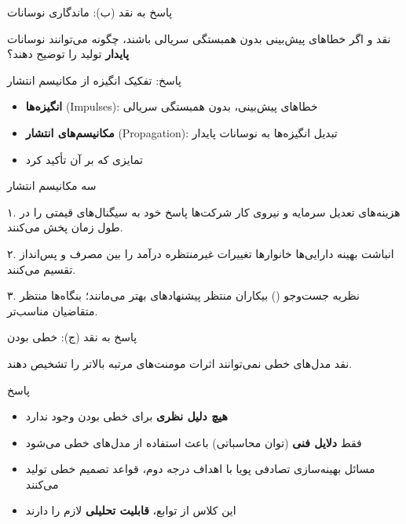 \documentclass[aspectratio=169,11pt]{beamer}
\newcommand{\highlight}[1]{\textcolor{AccentOrange}{\textbf{#1}}}
\newcommand{\important}[1]{\textcolor{AlertRed}{\textbf{#1}}}
\begin{document}
\begin{frame}{پاسخ به نقد (ب): ماندگاری نوسانات}
	\begin{alertblock}{نقد  و }
		\centering
		اگر خطاهای پیش‌بینی بدون همبستگی سریالی باشند، چگونه می‌توانند نوسانات \important{پایدار} تولید را توضیح دهند؟
	\end{alertblock}
	\vspace{0.3cm}
	\begin{exampleblock}{پاسخ: تفکیک انگیزه از مکانیسم انتشار}
		\begin{itemize}
			\item \highlight{انگیزه‌ها} (Impulses): خطاهای پیش‌بینی، بدون همبستگی سریالی
			\item \highlight{مکانیسم‌های انتشار} (Propagation): تبدیل انگیزه‌ها به نوسانات پایدار
			\item تمایزی که  بر آن تأکید کرد
		\end{itemize}
	\end{exampleblock}
\end{frame}

\begin{frame}{سه مکانیسم انتشار}
	\begin{block}{۱. هزینه‌های تعدیل سرمایه و نیروی کار}
		\centering
		شرکت‌ها پاسخ خود به سیگنال‌های قیمتی را در طول زمان پخش می‌کنند.
	\end{block}
	\vspace{0.2cm}
	\begin{block}{۲. انباشت بهینه دارایی‌ها}
		\centering
		خانوارها تغییرات غیرمنتظره درآمد را بین مصرف و پس‌انداز تقسیم می‌کنند.
	\end{block}
	\vspace{0.2cm}
	\begin{block}{۳. نظریه جست‌وجو ()}
		\centering
		بیکاران منتظر پیشنهادهای بهتر می‌مانند؛ بنگاه‌ها منتظر متقاضیان مناسب‌تر.
	\end{block}
\end{frame}

\begin{frame}{پاسخ به نقد (ج): خطی بودن}
	\begin{alertblock}{نقد}
		\centering
		مدل‌های خطی نمی‌توانند اثرات مومنت‌های مرتبه بالاتر را تشخیص دهند.
	\end{alertblock}
	\vspace{0.3cm}
	\begin{exampleblock}{پاسخ}
		\begin{itemize}
			\item \important{هیچ دلیل نظری} برای خطی بودن وجود ندارد
			\item فقط \highlight{دلایل فنی} (توان محاسباتی) باعث استفاده از مدل‌های خطی می‌شود
			\item مسائل بهینه‌سازی تصادفی پویا با اهداف درجه دوم، قواعد تصمیم خطی تولید می‌کنند
			\item این کلاس از توابع، \highlight{قابلیت تحلیلی} لازم را دارند
		\end{itemize}
	\end{exampleblock}
\end{frame}
\end{document}
